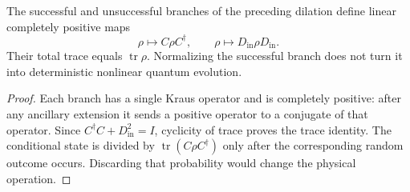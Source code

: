 \begin{proposition}
\label{prop:fluid-postselection-instrument}
The successful and unsuccessful branches of the preceding dilation define linear completely positive maps
\[
 \rho\longmapsto C\rho C^\dagger,\qquad
 \rho\longmapsto D_{\mathrm{in}}\rho D_{\mathrm{in}}.
\]
Their total trace equals $\operatorname{tr}\rho$. Normalizing the successful branch does not turn it into deterministic nonlinear quantum evolution.
\end{proposition}
\begin{proof}
Each branch has a single Kraus operator and is completely positive: after any ancillary extension it sends a positive operator to a conjugate of that operator. Since $C^\dagger C+D_{\mathrm{in}}^2=I$, cyclicity of trace proves the trace identity. The conditional state is divided by $\operatorname{tr}(C\rho C^\dagger)$ only after the corresponding random outcome occurs. Discarding that probability would change the physical operation.
\end{proof}

